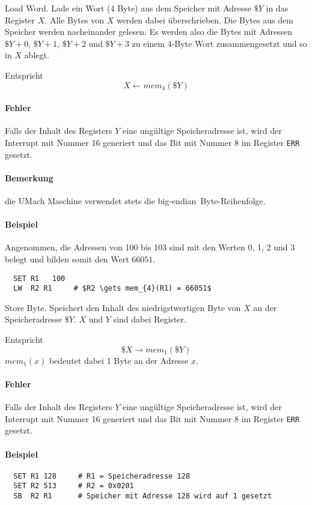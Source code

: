 \glqq Load Word\grqq.
Lade ein Wort (4 Byte) aus dem Speicher mit Adresse $\$Y$ in das Register $X$.
Alle Bytes von $X$ werden dabei überschrieben. Die Bytes aus dem Speicher werden
nacheinander gelesen. Es werden also die Bytes mit Adressen $\$Y + 0$, $\$Y +
1$, $\$Y + 2$ und $\$Y + 3$ zu einem 4-Byte Wort zusammengesetzt und so in $X$
ablegt.

Entspricht 
\[
  X \gets mem_{4}(\$Y)
\]

\paragraph{Fehler}
Falls der Inhalt des Registers $Y$ eine ungültige Speicheradresse ist,
wird der Interrupt mit Nummer 16 generiert und das Bit mit Nummer 8 im Register
\texttt{ERR} gesetzt.


\paragraph{Bemerkung}
die UMach Maschine verwendet stets die \glqq big-endian\grqq\ Byte-Reihenfolge.


\paragraph{Beispiel}
Angenommen, die Adressen von 100 bis 103 sind mit den Werten 0, 1, 2 und 3
belegt und bilden somit den Wert $66051$.
\begin{lstlisting}
  SET R1   100
  LW  R2 R1     # $R2 \gets mem_{4}(R1) = 66051$
\end{lstlisting}




\glqq Store Byte\grqq.
Speichert den Inhalt des niedrigstwertigen Byte von $X$ an der Speicheradresse
$\$Y$. $X$ und $Y$ sind dabei Register.

Entspricht
\[
    \$X \to mem_{1} (\$Y)
\]
$mem_{1}(x)$ bedeutet dabei 1 Byte an der Adresse $x$.

\paragraph{Fehler}
Falls der Inhalt des Registers $Y$ eine ungültige Speicheradresse ist,
wird der Interrupt mit Nummer 16 generiert und das Bit mit Nummer 8 im Register
\texttt{ERR} gesetzt.

\paragraph{Beispiel}
\begin{lstlisting}
  SET R1 128     # R1 = Speicheradresse 128
  SET R2 513     # R2 = 0x0201
  SB  R2 R1      # Speicher mit Adresse 128 wird auf 1 gesetzt
\end{lstlisting}




